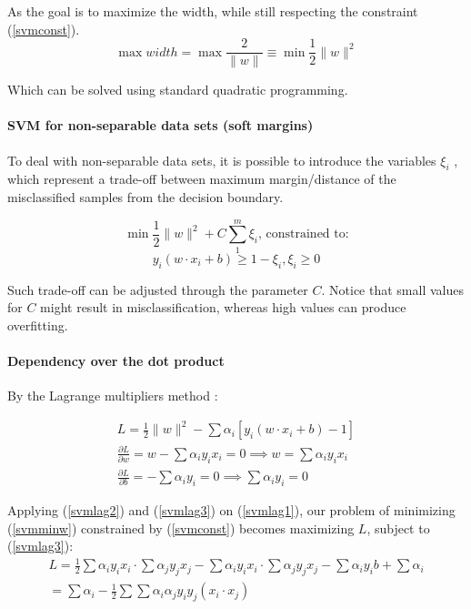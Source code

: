 \documentclass[12pt]{article}
\begin{document}
As the goal is to maximize the width, while still respecting the constraint (\ref{svmconst}).
\begin{equation} \label{svmminw}
	\max width = \max \frac{2}{\|w\|} \equiv \min \frac{1}{2} \|w\|^2
\end{equation}

Which can be solved using standard quadratic programming.

\paragraph{SVM for non-separable data sets (soft margins)}

To deal with non-separable data sets, it is possible to introduce the variables $\xi_i$ \cite{wessvmdef}, which represent a trade-off between maximum margin/distance of the misclassified samples from the decision boundary.

$$\min \frac{1}{2} \|w\|^2 + C \sum_{1}^{m}\xi_i \text{, constrained to:}$$
$$y_i(w \cdot x_i +b) \geq 1- \xi_i, \xi_i \geq 0$$

Such trade-off can be adjusted through the parameter $C$. Notice that small values for $C$ might result in misclassification, whereas high values can produce overfitting.

\paragraph{Dependency over the dot product}

By the Lagrange multipliers method \cite{mitsvm}:

\begin{gather} \label{svmlag1}
	L = \frac{1}{2}\|w\|^2 - \sum \alpha_i[y_i(w \cdot x_i +b) -1] \\
	\label{svmlag2}
	\frac{\partial L}{\partial w} = w -\sum\alpha_i y_i x_i = 0 \implies w = \sum\alpha_i y_i x_i \\
	\label{svmlag3}
	\frac{\partial L}{\partial b} = -\sum\alpha_i y_i = 0 \implies \sum\alpha_i y_i = 0
\end{gather}

Applying (\ref{svmlag2}) and (\ref{svmlag3}) on (\ref{svmlag1}), our problem of minimizing (\ref{svmminw}) constrained by (\ref{svmconst}) becomes maximizing $L$, subject to (\ref{svmlag3}):
\begin{gather*}
L = \frac{1}{2}\sum\alpha_i y_i x_i \cdot \sum\alpha_j y_j x_j
- \sum \alpha_i y_i x_i \cdot \sum \alpha_j y_j x_j
- \sum \alpha_i y_i b + \sum \alpha_i \\
= \sum\alpha_i -\frac{1}{2}\sum\sum\alpha_i\alpha_j y_i y_j (x_i \cdot x_j)
\end{gather*}
\end{document}
